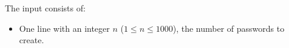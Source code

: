 
  The input consists of:
  \begin{itemize}
    \item One line with an integer $n$ ($1 \le n \le 1000$), the number of passwords to create.
  \end{itemize}
